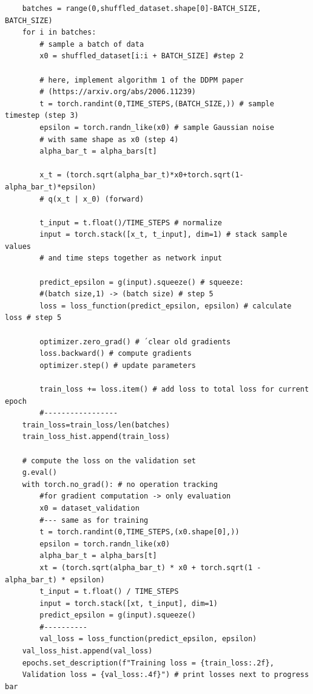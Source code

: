 \begin{verbatim}
    batches = range(0,shuffled_dataset.shape[0]-BATCH_SIZE, BATCH_SIZE)
    for i in batches:
        # sample a batch of data
        x0 = shuffled_dataset[i:i + BATCH_SIZE] #step 2

        # here, implement algorithm 1 of the DDPM paper 
        # (https://arxiv.org/abs/2006.11239)
        t = torch.randint(0,TIME_STEPS,(BATCH_SIZE,)) # sample timestep (step 3)
        epsilon = torch.randn_like(x0) # sample Gaussian noise
        # with same shape as x0 (step 4)
        alpha_bar_t = alpha_bars[t]

        x_t = (torch.sqrt(alpha_bar_t)*x0+torch.sqrt(1-alpha_bar_t)*epsilon) 
        # q(x_t | x_0) (forward)

        t_input = t.float()/TIME_STEPS # normalize
        input = torch.stack([x_t, t_input], dim=1) # stack sample values
        # and time steps together as network input

        predict_epsilon = g(input).squeeze() # squeeze: 
        #(batch size,1) -> (batch size) # step 5
        loss = loss_function(predict_epsilon, epsilon) # calculate loss # step 5

        optimizer.zero_grad() # ´clear old gradients
        loss.backward() # compute gradients
        optimizer.step() # update parameters

        train_loss += loss.item() # add loss to total loss for current epoch
        #-----------------
    train_loss=train_loss/len(batches)
    train_loss_hist.append(train_loss)
    
    # compute the loss on the validation set
    g.eval()
    with torch.no_grad(): # no operation tracking
        #for gradient computation -> only evaluation
        x0 = dataset_validation
        #--- same as for training
        t = torch.randint(0,TIME_STEPS,(x0.shape[0],))
        epsilon = torch.randn_like(x0) 
        alpha_bar_t = alpha_bars[t]
        xt = (torch.sqrt(alpha_bar_t) * x0 + torch.sqrt(1 - alpha_bar_t) * epsilon) 
        t_input = t.float() / TIME_STEPS
        input = torch.stack([xt, t_input], dim=1)
        predict_epsilon = g(input).squeeze()
        #----------
        val_loss = loss_function(predict_epsilon, epsilon)
    val_loss_hist.append(val_loss)
    epochs.set_description(f"Training loss = {train_loss:.2f},
    Validation loss = {val_loss:.4f}") # print losses next to progress bar
\end{verbatim}

